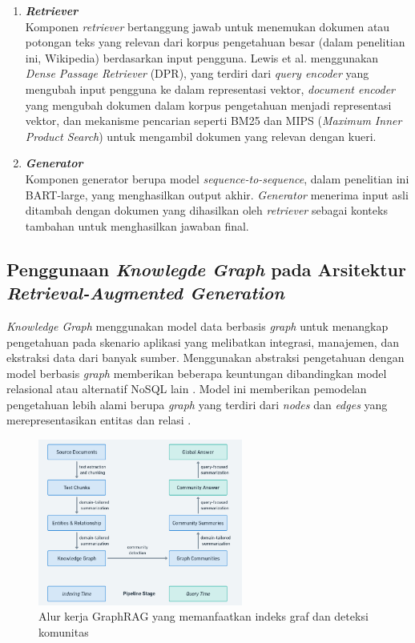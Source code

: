 \begin{enumerate}
	\item \textbf{\textit{Retriever}} \\
	      Komponen \textit{retriever} bertanggung jawab untuk menemukan dokumen atau potongan teks yang relevan dari korpus pengetahuan besar (dalam penelitian ini, Wikipedia) berdasarkan input pengguna.
	      Lewis et al. menggunakan \textit{Dense Passage Retriever} (DPR), yang terdiri dari
	      \textit{query encoder} yang mengubah input pengguna ke dalam representasi vektor,
	      \textit{document encoder} yang mengubah dokumen dalam korpus pengetahuan menjadi representasi vektor, dan
	      mekanisme pencarian seperti BM25 dan MIPS (\textit{Maximum Inner Product Search}) untuk mengambil dokumen yang relevan dengan kueri.
	\item \textbf{\textit{Generator}} \\
	      Komponen generator berupa model \textit{sequence-to-sequence}, dalam penelitian ini BART-large, yang menghasilkan output akhir.
	      \textit{Generator} menerima input asli ditambah dengan dokumen yang dihasilkan oleh \textit{retriever} sebagai konteks tambahan untuk menghasilkan jawaban final.
\end{enumerate}


\subsection{Penggunaan \textit{Knowlegde Graph} pada Arsitektur \textit{Retrieval-Augmented Generation}}
\textit{Knowledge Graph} menggunakan model data berbasis \textit{graph} untuk menangkap pengetahuan pada skenario aplikasi yang melibatkan integrasi, manajemen, dan ekstraksi data dari banyak sumber.
Menggunakan abstraksi pengetahuan dengan model berbasis \textit{graph} memberikan beberapa keuntungan dibandingkan model relasional atau alternatif NoSQL lain \cite{IndustryScaleKnowledgeGraph}.
Model ini memberikan pemodelan pengetahuan lebih alami berupa \textit{graph} yang terdiri dari \textit{nodes} dan \textit{edges} yang merepresentasikan entitas dan relasi \cite{ComparisonofCurrentGraphDatabaseModels}. \\

\begin{figure}[h]
	\centering
	\includegraphics[width=0.6\textwidth]{images/graph-rag-pipeline.png}
	\caption{
		Alur kerja GraphRAG yang memanfaatkan indeks graf dan deteksi komunitas \cite{Edge2025LocalGlobalGraphRAG}
	}
	\label{fig:graphragpipeline}
\end{figure}

